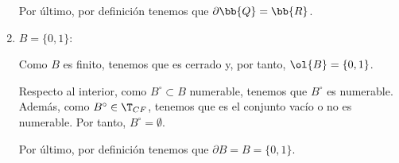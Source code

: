 \begin{ejercicio}
\begin{enumerate}
            Por último, por definición tenemos que $\partial \bb{Q}=\bb{R}$.
        
        \item $B=\{0,1\}$:

            Como $B$ es finito, tenemos que es cerrado y, por tanto, $\ol{B}=\{0,1\}$.

            Respecto al interior, como $B^\circ \subset B$ numerable, tenemos que $B^\circ$ es numerable. Además, como $B^\circ \in \T_{CF}$, tenemos que es el conjunto vacío o no es numerable. Por tanto, $B^\circ = \emptyset$.

            
            Por último, por definición tenemos que $\partial B=B=\{0,1\}$.
    \end{enumerate}
\end{ejercicio}

